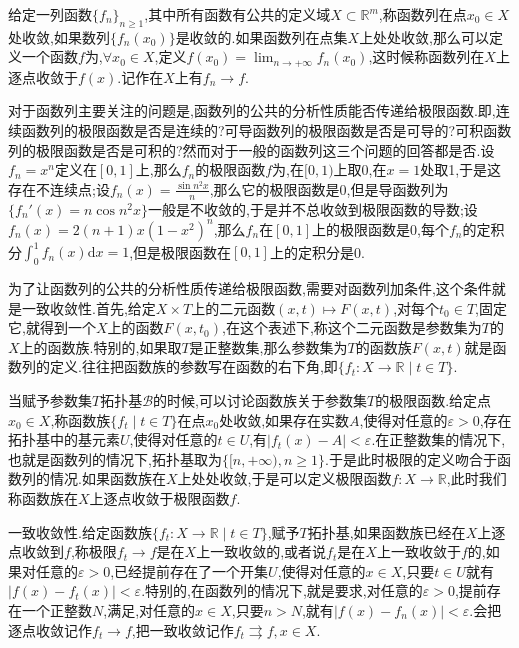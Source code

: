 给定一列函数$\{f_n\}_{n\ge1}$,其中所有函数有公共的定义域$X\subset\mathbb{R}^m$,称函数列在点$x_0\in X$处收敛,如果数列$\{f_n(x_0)\}$是收敛的.如果函数列在点集$X$上处处收敛,那么可以定义一个函数$f$为,$\forall x_0\in X$,定义$f(x_0)=\lim_{n\to+\infty}f_n(x_0)$,这时候称函数列在$X$上逐点收敛于$f(x)$.记作在$X$上有$f_n\to f$.

对于函数列主要关注的问题是,函数列的公共的分析性质能否传递给极限函数.即,连续函数列的极限函数是否是连续的?可导函数列的极限函数是否是可导的?可积函数列的极限函数是否是可积的?然而对于一般的函数列这三个问题的回答都是否.设$f_n=x^n$定义在$[0,1]$上,那么$f_n$的极限函数$f$为,在$[0,1)$上取0,在$x=1$处取1,于是这存在不连续点;设$f_n(x)=\frac{\sin n^2x}{n}$,那么它的极限函数是0,但是导函数列为$\{f_n'(x)=n\cos n^2x\}$一般是不收敛的,于是并不总收敛到极限函数的导数;设$f_n(x)=2(n+1)x(1-x^2)^n$,那么$f_n$在$[0,1]$上的极限函数是0,每个$f_n$的定积分$\int_0^1f_n(x)\mathrm{d}x=1$,但是极限函数在$[0,1]$上的定积分是0.

为了让函数列的公共的分析性质传递给极限函数,需要对函数列加条件,这个条件就是一致收敛性.首先,给定$X\times T$上的二元函数$(x,t)\mapsto F(x,t)$,对每个$t_0\in T$,固定它,就得到一个$X$上的函数$F(x,t_0)$,在这个表述下,称这个二元函数是参数集为$T$的$X$上的函数族.特别的,如果取$T$是正整数集,那么参数集为$T$的函数族$F(x,t)$就是函数列的定义.往往把函数族的参数写在函数的右下角,即$\{f_t:X\to\mathbb{R}\mid t\in T\}$.

当赋予参数集$T$拓扑基$\mathscr{B}$的时候,可以讨论函数族关于参数集$T$的极限函数.给定点$x_0\in X$,称函数族$\{f_t\mid t\in T\}$在点$x_0$处收敛,如果存在实数$A$,使得对任意的$\varepsilon>0$,存在拓扑基中的基元素$U$,使得对任意的$t\in U$,有$|f_t(x)-A|<\varepsilon$.在正整数集的情况下,也就是函数列的情况下,拓扑基取为$\{[n,+\infty),n\ge1\}$.于是此时极限的定义吻合于函数列的情况.如果函数族在$X$上处处收敛,于是可以定义极限函数$f:X\to\mathbb{R}$,此时我们称函数族在$X$上逐点收敛于极限函数$f$.

一致收敛性.给定函数族$\{f_t:X\to\mathbb{R}\mid t\in T\}$,赋予$T$拓扑基,如果函数族已经在$X$上逐点收敛到$f$,称极限$f_t\to f$是在$X$上一致收敛的,或者说$f_t$是在$X$上一致收敛于$f$的,如果对任意的$\varepsilon>0$,已经提前存在了一个开集$U$,使得对任意的$x\in X$,只要$t\in U$就有$|f(x)-f_t(x)|<\varepsilon$.特别的,在函数列的情况下,就是要求,对任意的$\varepsilon>0$,提前存在一个正整数$N$,满足,对任意的$x\in X$,只要$n>N$,就有$|f(x)-f_n(x)|<\varepsilon$.会把逐点收敛记作$f_t\to f$,把一致收敛记作$f_t\rightrightarrows f,x\in X$.

